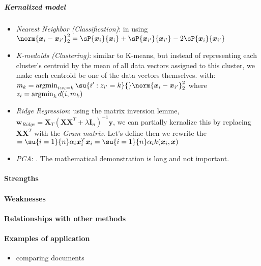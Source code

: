 \subparagraph{Kernalized model}
\begin{itemize}
    \item \emph{Nearest Neighbor (Classification)}: in using $\norm{\bm{x}_{i}
        -\bm{x}_{i'}}^{2}_{2} = \sP{\bm{x}_{i}}{\bm{x}_{i}}  +
        \sP{\bm{x}_{i'}}{\bm{x}_{i'}} -2\sP{\bm{x}_{i}}{\bm{x}_{i'}}$
    \item \emph{K-medoids (Clustering)}: similar to K-means, but instead of
        representing each cluster's centroid by the mean of all data vectors
        assigned to this cluster, we make each centroid be one of the data 
        vectors themselves.  with: $m_{k} = 
        \argmin_{i:z_{i}=k}\su{i':z_{i'}=k}{}
        \norm{\bm{x}_{i}-\bm{x}_{i'}}^{2}_{2}$ where $z_{i} = \operatorname*{argmin}_{k} 
        d(i,m_{k})$
    \item \emph{Ridge Regression}: using the matrix inversion lemme, $\bm{w}_{
        Ridge} = \bm{X}_{T}\left(\bm{X}\bm{X}^{T}+\lambda\bm{I}_{n}\right)^{
        -1}\bm{y}$, we can partially kernalize this by replacing $\bm{X}
        \bm{X}^{T}$ with the \emph{Gram matrix}. Let's define  then we rewrite the $=\su{i=1}{n}\alpha_{i}\bm{x}_{i}^{T}\bm{x}
        _{i} = \su{i=1}{n}\alpha_{i}k(\bm{x}_{i},\bm{x})$
    \item \emph{PCA}: . The mathematical demonstration is long and not 
        important.
\end{itemize}


\paragraph{Strengths}
\paragraph{Weaknesses}
\paragraph{Relationships with other methods}
\paragraph{Examples of application}
\begin{itemize}
    \item comparing documents
\end{itemize}


